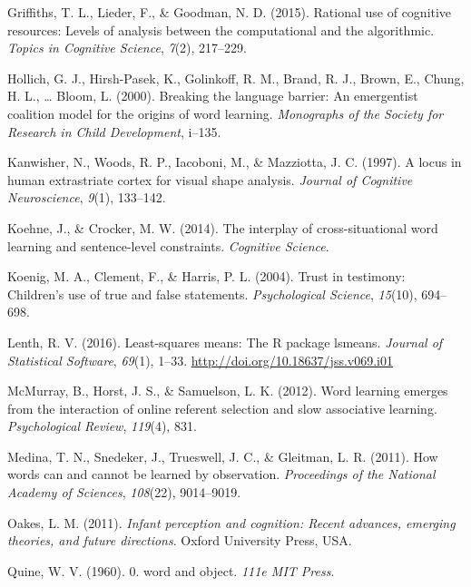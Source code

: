\documentclass[authoryear, review]{elsarticle}
\begin{document}
\hypertarget{ref-griffiths2015rational}{}
Griffiths, T. L., Lieder, F., \& Goodman, N. D. (2015). Rational use of
cognitive resources: Levels of analysis between the computational and
the algorithmic. \emph{Topics in Cognitive Science}, \emph{7}(2),
217--229.

\hypertarget{ref-hollich2000breaking}{}
Hollich, G. J., Hirsh-Pasek, K., Golinkoff, R. M., Brand, R. J., Brown,
E., Chung, H. L., \ldots{} Bloom, L. (2000). Breaking the language
barrier: An emergentist coalition model for the origins of word
learning. \emph{Monographs of the Society for Research in Child
Development}, i--135.

\hypertarget{ref-kanwisher1997locus}{}
Kanwisher, N., Woods, R. P., Iacoboni, M., \& Mazziotta, J. C. (1997). A
locus in human extrastriate cortex for visual shape analysis.
\emph{Journal of Cognitive Neuroscience}, \emph{9}(1), 133--142.

\hypertarget{ref-koehne2014interplay}{}
Koehne, J., \& Crocker, M. W. (2014). The interplay of cross-situational
word learning and sentence-level constraints. \emph{Cognitive Science}.

\hypertarget{ref-koenig2004trust}{}
Koenig, M. A., Clement, F., \& Harris, P. L. (2004). Trust in testimony:
Children's use of true and false statements. \emph{Psychological
Science}, \emph{15}(10), 694--698.

\hypertarget{ref-lenth2016lsmeans}{}
Lenth, R. V. (2016). Least-squares means: The R package lsmeans.
\emph{Journal of Statistical Software}, \emph{69}(1), 1--33.
\url{http://doi.org/10.18637/jss.v069.i01}

\hypertarget{ref-mcmurray2012word}{}
McMurray, B., Horst, J. S., \& Samuelson, L. K. (2012). Word learning
emerges from the interaction of online referent selection and slow
associative learning. \emph{Psychological Review}, \emph{119}(4), 831.

\hypertarget{ref-medina2011words}{}
Medina, T. N., Snedeker, J., Trueswell, J. C., \& Gleitman, L. R.
(2011). How words can and cannot be learned by observation.
\emph{Proceedings of the National Academy of Sciences}, \emph{108}(22),
9014--9019.

\hypertarget{ref-oakes2011infant}{}
Oakes, L. M. (2011). \emph{Infant perception and cognition: Recent
advances, emerging theories, and future directions}. Oxford University
Press, USA.

\hypertarget{ref-quine19600}{}
Quine, W. V. (1960). 0. word and object. \emph{111e MIT Press}.
\end{document}
